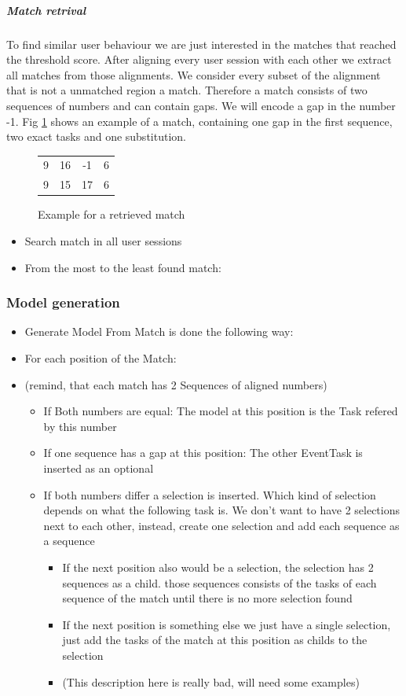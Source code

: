 \subparagraph{Match retrival}
To find similar user behaviour we are just interested in the matches that reached the threshold score. After aligning every user session with each other we extract all matches from those alignments.
We consider every subset of the alignment that is not a unmatched region a match.
Therefore a match consists of two sequences of numbers and can contain gaps. We will encode a gap in the number -1. 
Fig \ref{fig:matchexample} shows an example of a match, containing one gap in the first sequence, two exact tasks and one substitution.


\begin{figure}[h]
	\centering
	\begin{tabular}{cccc}
		9 & 16 & -1 & 6 \\
		9 & 15 & 17 & 6  
	\end{tabular}
	\caption{Example for a retrieved match}
	\label{fig:matchexample}
\end{figure}
	\begin{itemize}
		\item Search match in all user sessions
		\item From the most to the least found match:
	\end{itemize}
\subsubsection{Model generation}
	\begin{itemize}
		\item Generate Model From Match is done the following way:
		\item For each position of the Match: 
		\item (remind, that each match has 2 Sequences of aligned numbers)
		\begin{itemize}
			\item If Both numbers are equal: The model at this position is the Task refered by this number
			\item If one sequence has a gap at this position: The other EventTask is inserted as an optional
			\item If both numbers differ a selection is inserted. Which kind of selection depends on what the following task is. We don't want to have 2 selections next to each other, instead, create one selection and add each sequence as a sequence
			\begin{itemize}
				\item If the next position also would be a selection, the selection has 2 sequences as a child. those sequences consists of the tasks of each sequence of the match until there is no more selection found 
				\item If the next position is something else we just have a single selection, just add the tasks of the match at this position as childs to the selection
				\item (This description here is really bad, will need some examples)
			\end{itemize}
		\end{itemize}
	\end{itemize}

